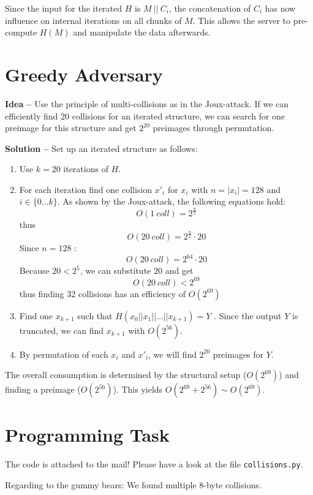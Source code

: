 Since the input for the iterated $ H $ is $ M\ ||\ C_{i} $, the concatenation of $ C_{i} $ has now influence on internal iterations on all chunks of $ M $. This allows the server to pre-compute $ H(M) $ and manipulate the data afterwards.

\newpage
\section{Greedy Adversary}

\textbf{Idea --} Use the principle of multi-collisions as in the Joux-attack. If we can efficiently find 20 collisions for an iterated structure, we can search for one preimage for this structure and get $ 2^{20} $ preimages through permutation.

\textbf{Solution --} Set up an iterated structure as follows:

\begin{enumerate}
\item Use $ k = 20 $ iterations of $ H $.
\item For each iteration find one collision $ x'_{i} $ for $ x_{i} $ with $ n = |x_{i}| = 128 $ and $ i \in \{0...k\} $. As shown by the Joux-attack, the following equations hold:
$$
O(1\ coll) = 2^{\frac{n}{2}}
$$ thus
$$
O(20\ coll) = 2^{\frac{n}{2}} \cdot 20
$$
Since $ n = 128 $ :
$$
O(20\ coll) = 2^{64} \cdot 20
$$
Because $ 20 < 2^{5} $, we can substitute $ 20 $ and get
$$
O(20\ coll) < 2^{69}
$$
thus finding 32 collisions has an efficiency of $ O(2^{69}) $
\item Find one $ x_{k+1} $ such that $ H(x_{0} || x_{1} || ... || x_{k+1} ) = Y $ . Since the output $ Y $ is truncated, we can find $ x_{k+1} $ with $ O(2^{56}) $.
\item By permutation of each $ x_{i} $ and $ x'_{i} $, we will find $ 2^{20} $ preimages for $ Y $.

\end{enumerate}

The overall consumption is determined by the structural setup ($ O(2^{69}) $) and finding a preimage ($ O( 2^{56} ) $). This yields $ O(2^{69} + 2^{56}) \sim O(2^{69} ) $.

\section{Programming Task}

The code is attached to the mail! Please have a look at the file \texttt{collisions.py}.

Regarding to the gummy bears: We found multiple 8-byte collisions.


